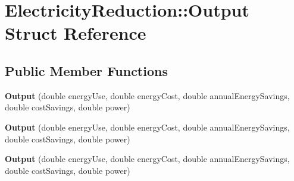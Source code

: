 \hypertarget{struct_electricity_reduction_1_1_output}{}\section{Electricity\+Reduction\+:\+:Output Struct Reference}
\label{struct_electricity_reduction_1_1_output}
\subsection*{Public Member Functions}
\begin{DoxyCompactItemize}
\item 
\mbox{\label{struct_electricity_reduction_1_1_output_a075502910a0c2a293ffad650c6bb9fa3}} 
{\bfseries Output} (double energy\+Use, double energy\+Cost, double annual\+Energy\+Savings, double cost\+Savings, double power)
\item 
\mbox{\label{struct_electricity_reduction_1_1_output_a075502910a0c2a293ffad650c6bb9fa3}} 
{\bfseries Output} (double energy\+Use, double energy\+Cost, double annual\+Energy\+Savings, double cost\+Savings, double power)
\item 
\mbox{\label{struct_electricity_reduction_1_1_output_a075502910a0c2a293ffad650c6bb9fa3}} 
{\bfseries Output} (double energy\+Use, double energy\+Cost, double annual\+Energy\+Savings, double cost\+Savings, double power)
\end{DoxyCompactItemize}
